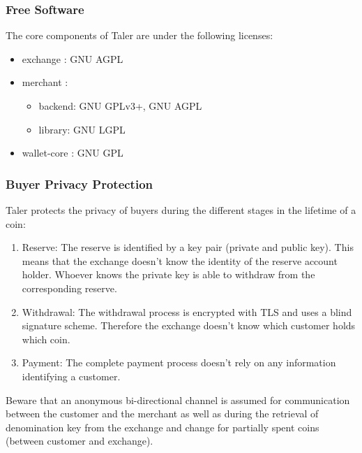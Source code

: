 \subsubsection{Free Software}
The core components of \acl{Taler} are under the following licenses:
\begin{itemize}
    \item exchange \cite{taler-git:exchange}: \ac{GNU AGPL}
    \item merchant \cite{taler-git:merchant}:
          \begin{itemize}
              \item backend: \ac{GNU GPL}v3+, \ac{GNU AGPL}
              \item library: \ac{GNU LGPL}
          \end{itemize}
    \item wallet-core \cite{taler-git:wallet-core}: \ac{GNU GPL}
\end{itemize}

\newpage

\subsubsection{Buyer Privacy Protection}
Taler protects the privacy of buyers during the different stages in the lifetime of a coin:
\begin{enumerate}
    \item Reserve: The reserve is identified by a key pair (private and public key).
          This means that the exchange doesn't know the identity of the reserve account holder.
          Whoever knows the private key is able to withdraw from the corresponding reserve.
    \item Withdrawal: The withdrawal process is encrypted with TLS and uses a blind signature scheme.
          Therefore the exchange doesn't know which customer holds which coin.
    \item Payment: The complete payment process doesn't rely on any information identifying a customer.
\end{enumerate}
Beware that an anonymous bi-directional channel is assumed for communication between the customer and the merchant as well as during the retrieval of denomination key from the exchange and change for partially spent coins (between customer and exchange).


